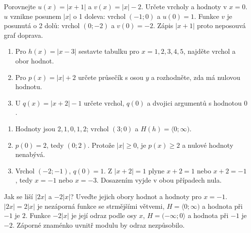 \documentclass[11pt,a4paper]{article}
\begin{document}
\begin{center}
\end{center}
\begin{prikladReseniBox}[title={Příklad 2}]
Porovnejte $u(x)=|x+1|$ a $v(x)=|x|-2$. Určete vrcholy a hodnoty v $x=0$.
\tcblower
$u$ vznikne posunem $|x|$ o 1 doleva: vrchol $(-1;0)$ a $u(0)=1$. Funkce $v$ je posunutá o 2 dolů: vrchol $(0;-2)$ a $v(0)=-2$. Zápis $|x+1|$ proto neposouvá graf doprava.
\end{prikladReseniBox}
\begin{zadaniReseniBox}[title={Samostatná práce 1}]
\begin{enumerate}[label=\alph*)]
\item Pro $h(x)=|x-3|$ sestavte tabulku pro $x=1,2,3,4,5$, najděte vrchol a obor hodnot.
\item Pro $p(x)=|x|+2$ určete průsečík s osou $y$ a rozhodněte, zda má nulovou hodnotu.
\item U $q(x)=|x+2|-1$ určete vrchol, $q(0)$ a dvojici argumentů s hodnotou $0$.
\end{enumerate}
\tcblower
\begin{enumerate}[label=\alph*)]
\item Hodnoty jsou $2,1,0,1,2$; vrchol $(3;0)$ a $H(h)=\langle0;\infty)$.
\item $p(0)=2$, tedy $(0;2)$. Protože $|x|\ge0$, je $p(x)\ge2$ a nulové hodnoty nenabývá.
\item Vrchol $(-2;-1)$, $q(0)=1$. Z $|x+2|=1$ plyne $x+2=1$ nebo $x+2=-1$, tedy $x=-1$ nebo $x=-3$. Dosazením vyjde v obou případech nula.
\end{enumerate}
\end{zadaniReseniBox}
\begin{prikladReseniBox}[title={Příklad 3}]
Jak se liší $|2x|$ a $-2|x|$? Uveďte jejich obory hodnot a hodnoty pro $x=-1$.
\tcblower
$|2x|=2|x|$ je nezáporná funkce se strmějšími větvemi, $H=\langle0;\infty)$ a hodnota při $-1$ je $2$. Funkce $-2|x|$ je její odraz podle osy $x$, $H=(-\infty;0\rangle$ a hodnota při $-1$ je $-2$. Záporné znaménko uvnitř modulu by odraz nezpůsobilo.
\end{prikladReseniBox}
\end{document}
